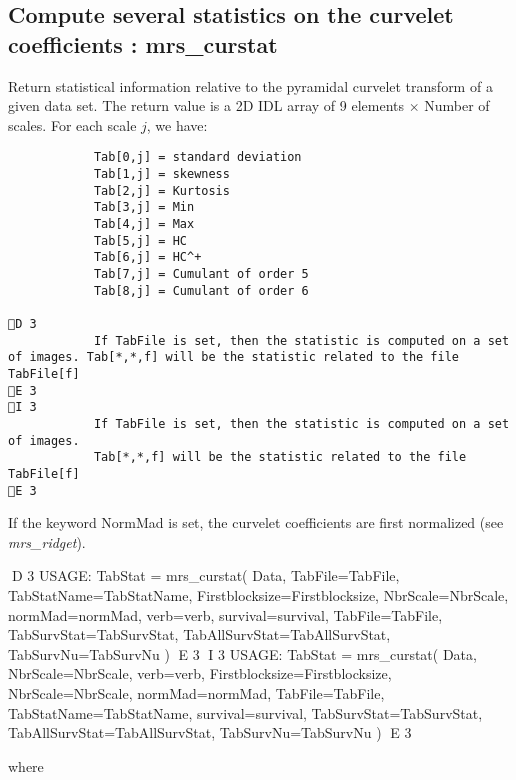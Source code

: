 \subsection{Compute several statistics on the curvelet coefficients : mrs\_curstat}
Return statistical information relative to the pyramidal curvelet transform of a given data set.
The return value is a 2D IDL array of 9 elements $\times$ Number of scales. For each scale $j$, we have:
\begin{verbatim}
			Tab[0,j] = standard deviation
			Tab[1,j] = skewness
			Tab[2,j] = Kurtosis
			Tab[3,j] = Min
			Tab[4,j] = Max 
			Tab[5,j] = HC
			Tab[6,j] = HC^+
			Tab[7,j] = Cumulant of order 5
			Tab[8,j] = Cumulant of order 6

D 3
			If TabFile is set, then the statistic is computed on a set of images. Tab[*,*,f] will be the statistic related to the file TabFile[f]
E 3
I 3
			If TabFile is set, then the statistic is computed on a set of images.
			Tab[*,*,f] will be the statistic related to the file TabFile[f]
E 3
\end{verbatim}
If the keyword NormMad is set, the curvelet coefficients are first normalized (see {\em mrs\_ridget}).
{\bf
\begin{center}
D 3
     USAGE: TabStat = mrs\_curstat( Data, TabFile=TabFile, TabStatName=TabStatName, Firstblocksize=Firstblocksize, NbrScale=NbrScale, normMad=normMad, 
     verb=verb, survival=survival, TabFile=TabFile, TabSurvStat=TabSurvStat, TabAllSurvStat=TabAllSurvStat, TabSurvNu=TabSurvNu )  
E 3
I 3
     USAGE: TabStat = mrs\_curstat( Data, NbrScale=NbrScale, verb=verb, Firstblocksize=Firstblocksize, NbrScale=NbrScale, normMad=normMad, TabFile=TabFile, TabStatName=TabStatName, 
     survival=survival, TabSurvStat=TabSurvStat, TabAllSurvStat=TabAllSurvStat, TabSurvNu=TabSurvNu )  
E 3
\end{center}}
where 
